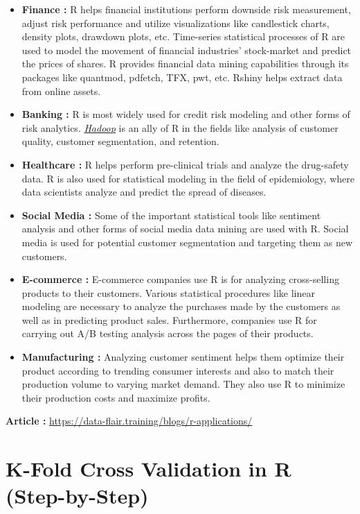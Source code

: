 \documentclass[
  letterpaper,
  DIV=11,
  numbers=noendperiod]{scrreprt}
\begin{document}
\begin{itemize}
\item
  \textbf{Finance :} R helps financial institutions perform downside
  risk measurement, adjust risk performance and utilize visualizations
  like candlestick charts, density plots, drawdown plots, etc.
  Time-series statistical processes of R are used to model the movement
  of financial industries' stock-market and predict the prices of
  shares. R provides financial data mining capabilities through its
  packages like quantmod, pdfetch, TFX, pwt, etc. Rshiny helps extract
  data from online assets.
\item
  \textbf{Banking :} R is most widely used for credit risk modeling and
  other forms of risk analytics.
  \href{https://data-flair.training/blogs/hadoop-tutorials-home/}{\emph{Hadoop}}
  is an ally of R in the fields like analysis of customer quality,
  customer segmentation, and retention.
\item
  \textbf{Healthcare :} R helps perform pre-clinical trials and analyze
  the drug-safety data. R is also used for statistical modeling in the
  field of epidemiology, where data scientists analyze and predict the
  spread of diseases.
\item
  \textbf{Social Media :} Some of the important statistical tools like
  sentiment analysis and other forms of social media data mining are
  used with R. Social media is used for potential customer segmentation
  and targeting them as new customers.
\item
  \textbf{E-commerce :} E-commerce companies use R is for analyzing
  cross-selling products to their customers. Various statistical
  procedures like linear modeling are necessary to analyze the purchases
  made by the customers as well as in predicting product sales.
  Furthermore, companies use R for carrying out A/B testing analysis
  across the pages of their products.
\item
  \textbf{Manufacturing :} Analyzing customer sentiment helps them
  optimize their product according to trending consumer interests and
  also to match their production volume to varying market demand. They
  also use R to minimize their production costs and maximize profits.
\end{itemize}

\textbf{Article :}
\url{https://data-flair.training/blogs/r-applications/}

\hypertarget{k-fold-cross-validation-in-r-step-by-step}{%
\section{K-Fold Cross Validation in R
(Step-by-Step)}\label{k-fold-cross-validation-in-r-step-by-step}}
\end{document}
